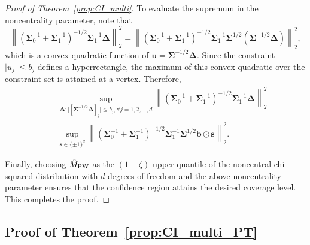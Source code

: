 \documentclass[11pt]{article}
\numberwithin{equation}{section}
\theoremstyle{definition}
\begin{document}
\begin{proof}[Proof of Theorem~\ref{prop:CI_multi}]
To evaluate the supremum in the noncentrality parameter, note that
\[
  \left\lVert
    (\bm{\Sigma}_0^{-1}+\bm{\Sigma}_1^{-1})^{-1/2}
    \bm{\Sigma}_1^{-1}\bm{\Delta}
  \right\rVert_2^2
  =
  \left\lVert
    (\bm{\Sigma}_0^{-1}+\bm{\Sigma}_1^{-1})^{-1/2}
    \bm{\Sigma}_1^{-1}\bm{\Sigma}^{1/2}
    (\bm{\Sigma}^{-1/2}\bm{\Delta})
  \right\rVert_2^2,
\]
which is a convex quadratic function of
$\bm{u}=\bm{\Sigma}^{-1/2}\bm{\Delta}$.
Since the constraint
$\lvert u_j\rvert\le b_j$ defines a hyperrectangle, the maximum of this convex
quadratic over the constraint set is attained at a vertex.
Therefore,
\begin{align*}
  &\sup_{\bm{\Delta}: \lvert [\bm{\Sigma}^{-1/2} \bm{\Delta}]_j \rvert \le b_j,\forall j=1,2,\ldots,d}\left\lVert (\bm{\Sigma}_0^{-1} + \bm{\Sigma}_1^{-1})^{-1/2} \bm{\Sigma}_1^{-1} \bm{\Delta}\right\rVert_2^2\\
  =& \sup_{\bm{s} \in \{\pm 1\}^d }\left\lVert (\bm{\Sigma}_0^{-1} + \bm{\Sigma}_1^{-1})^{-1/2} \bm{\Sigma}_1^{-1} \bm{\Sigma}^{1/2} \bm{b} \odot \bm{s}\right\rVert_2^2.
\end{align*}


Finally, choosing $\hat M_{\rm PW}$ as the $(1-\zeta)$ upper quantile of the
noncentral chi-squared distribution with $d$ degrees of freedom and the above
noncentrality parameter ensures that the confidence region attains the desired
coverage level. This completes the proof.

\end{proof}

\subsection{Proof of Theorem~\ref{prop:CI_multi_PT}}
\end{document}
